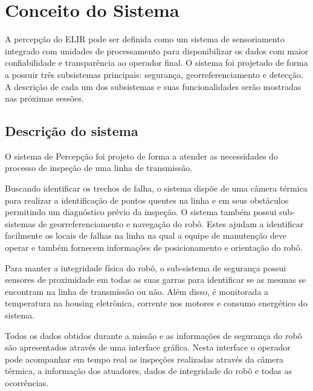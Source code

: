 \chapter{Conceito do Sistema}
\label{chap:concep}

A percepção do ELIR pode ser definida como um sistema de sensoriamento integrado com unidades de processamento para disponibilizar os dados com maior confiabilidade e  transparência ao operador final. O sistema foi projetado de forma a possuir três subsistemas principais: segurança, georreferenciamento e detecção. A descrição de cada um dos subsistemas e suas funcionalidades serão mostradas nas próximas sessões.



\section{Descrição do sistema}
\label{sec:desc}
O sistema de Percepção foi projeto de forma a atender as necessidades do processo de inspeção de uma linha de transmissão. 

Buscando identificar os trechos de falha, o sistema dispõe de uma câmera térmica para realizar a identificação de pontos quentes na linha e em seus obstáculos permitindo um diagnóstico prévio da inspeção. O sistema também possui sub-sistemas de georreferenciamento e navegação do robô. Estes ajudam a identificar facilmente os locais de falhas na linha na qual a equipe de manutenção deve operar e também fornecem informações de posicionamento e orientação do robô.

Para manter a integridade física do robô, o sub-sistema de segurança possui sensores de proximidade em todas as suas garras para identificar se as mesmas se encontram na linha de transmissão ou não. Além disso, é monitorada a temperatura na housing eletrônica, corrente nos motores e consumo energético do sistema. 


Todos os dados obtidos durante a missão e as informações de segurança do robô são apresentados através de uma interface gráfica. Nesta interface o operador pode acompanhar em tempo real as inspeções realizadas através da câmera térmica, a informação dos atuadores, dados de integridade do robô e todas as ocorrências. 

